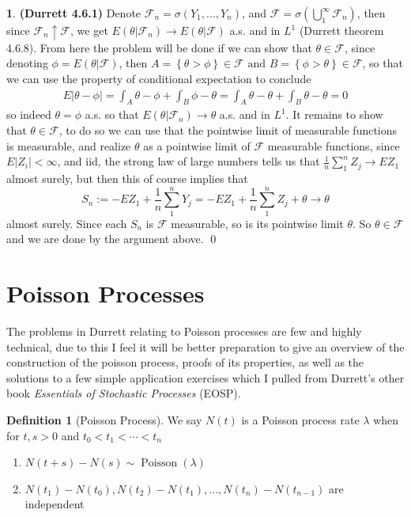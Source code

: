 \documentclass{article}
\theoremstyle{definition}
\newtheorem{pb}{}
\newtheorem{definition}{Definition}
\newcommand{\set}[1]{\left\{#1\right\}}
\newcommand{\abs}[1]{\left\vert#1\right\vert}
\newcommand{\tand}{\text{ and }}
\begin{document}
    \begin{pb}\textbf{(Durrett 4.6.1)}
        Denote \(\mathcal{F}_n = \sigma(Y_1,\hdots,Y_n)\), and \(\mathcal{F} = \sigma\left(\bigcup_1^\infty \mathcal{F}_n\right)\), then since \(\mathcal{F}_n \uparrow \mathcal{F}\), we get \(E(\theta|\mathcal{F}_n) \to E(\theta|\mathcal{F})\) a.s. and in \(L^1\) (Durrett theorem 4.6.8). From here the problem will be done if we can show that \(\theta \in \mathcal{F}\), since denoting \(\phi = E(\theta|\mathcal{F})\), then \(A = \set{\theta > \phi} \in \mathcal{F} \tand B = \set{\phi > \theta}\in \mathcal{F}\), so that we can use the property of conditional expectation to conclude
        \begin{align*}
            E\abs{\theta - \phi} = \int_A \theta - \phi + \int_B \phi - \theta = \int_A \theta - \theta + \int_B \theta - \theta = 0
        \end{align*}
        so indeed \(\theta = \phi\) a.s. so that \(E(\theta|\mathcal{F}_n) \to \theta\) a.s. and in \(L^1\). It remains to show that \(\theta \in \mathcal{F}\), to do so we can use that the pointwise limit of measurable functions is measurable, and realize \(\theta\) as a pointwise limit of \(\mathcal{F}\) measurable functions, since \(E\abs{Z_i} < \infty\), and iid, the strong law of large numbers tells us that \(\frac{1}{n}\sum_1^n Z_j \to EZ_1\) almost surely, but then this of course implies that \[S_n := -EZ_1 + \frac{1}{n}\sum_1^nY_j = - EZ_1 + \frac{1}{n}\sum_1^n Z_j + \theta \to \theta\]
        almost surely. Since each \(S_n\) is \(\mathcal{F}\) measurable, so is its pointwise limit \(\theta\). So \(\theta \in \mathcal{F}\) and we are done by the argument above. \qed
    \end{pb}

    \section{Poisson Processes}
    The problems in Durrett relating to Poisson processes are few and highly technical, due to this I feel it will be better preparation to give an overview of the construction of the poisson process, proofs of its properties, as well as the solutions to a few simple application exercises which I pulled from Durrett's other book \emph{Essentials of Stochastic Processes} (EOSP).

    \begin{definition}[Poisson Process]
        We say \(N(t)\) is a Poisson process rate \(\lambda\) when for \(t,s > 0\) and \(t_0 < t_1 < \cdots < t_n\)
        \begin{enumerate}
            \item \(N(t + s) - N(s) \sim \operatorname{Poisson}(\lambda)\)
            \item \(N(t_1) - N(t_0), N(t_2) - N(t_1), \hdots, N(t_n) - N(t_{n-1})\) are independent
        \end{enumerate}
    \end{definition}
\end{document}
